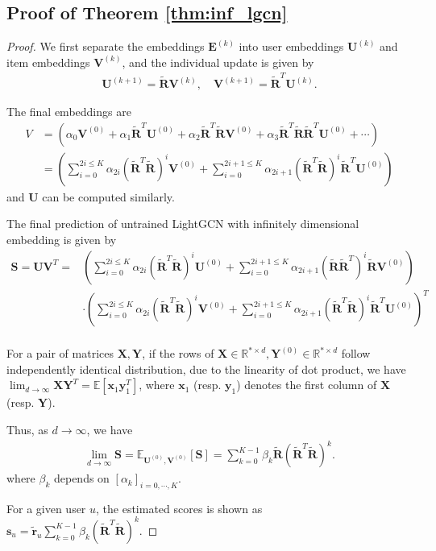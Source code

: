 \documentclass[sigconf]{acmart}
\begin{document}
\subsection{Proof of Theorem \ref{thm:inf_lgcn}}
\begin{proof}
We first separate the embeddings $\bm{E}^{(k)}$ into user embeddings $\bm{U}^{(k)}$ and item embeddings $\bm{V}^{(k)}$, and the individual update is given by
\begin{align*}
    \bm{U}^{(k+1)} = \tilde{\bm{R}} \bm{V}^{(k)}, \quad \bm{V}^{(k+1)} = \tilde{\bm{R}}^T \bm{U}^{(k)}.
\end{align*}

The final embeddings are 
\begin{align*}
    V &=  \left(\alpha_0\bm{V}^{(0)} + \alpha_1 \tilde{\bm{R}}^T\bm{U}^{(0)} + \alpha_2\tilde{\bm{R}}^T\tilde{\bm{R}}\bm{V}^{(0)} + \alpha_3 \tilde{\bm{R}}^T\tilde{\bm{R}}\tilde{\bm{R}}^T\bm{U}^{(0)} + \cdots\right) \\
    &= 
    \left(\sum_{i=0}^{2i \leq K} \alpha_{2i}(\tilde{\bm{R}}^T\tilde{\bm{R}})^{i} \bm{V}^{(0)} + \sum_{i = 0}^{2i+1 \leq K} \alpha_{2i+1}(\tilde{\bm{R}}^T \tilde{\bm{R}})^{i} \tilde{\bm{R}}^T \bm{U}^{(0)} \right)
\end{align*}
and $\bm{U}$ can be computed similarly.

The final prediction of untrained LightGCN with infinitely dimensional embedding is given by
\begin{align*} \label{eq:rec}
    \bm{S} = \bm{U} \bm{V}^T = &\left(\sum_{i=0}^{2i \leq K}\alpha_{2i} (\tilde{\bm{R}}^T\tilde{\bm{R}})^{i} \bm{U}^{(0)} + \sum_{i = 0}^{2i+1 \leq K} \alpha_{2i+1}(\tilde{\bm{R}} \tilde{\bm{R}}^T)^{i} \tilde{\bm{R}} \bm{V}^{(0)} \right)  \\
    &\cdot \left(\sum_{i=0}^{2i \leq K} \alpha_{2i}(\tilde{\bm{R}}^T\tilde{\bm{R}})^{i} \bm{V}^{(0)} + \sum_{i = 0}^{2i+1 \leq K} \alpha_{2i+1}(\tilde{\bm{R}}^T \tilde{\bm{R}})^{i} \tilde{\bm{R}}^T \bm{U}^{(0)} \right)^T \\
\end{align*}



For a pair of matrices $\bm{X}, \bm{Y}$, if the rows of $\bm{X} \in \mathbb{R}^{* \times d}, \bm{Y}^{(0)} \in \mathbb{R}^{* \times d} $ follow independently identical distribution, due to the linearity of dot product, we have $\lim_{d \rightarrow \infty} \bm{X} \bm{Y}^T = \mathbb{E} [\bm{x}_1 \bm{y}_1^T]$, where $\bm{x}_1$ (resp. $\bm{y}_1$) denotes the first column of $\bm{X}$ (resp. $\bm{Y}$).

Thus, as $d \rightarrow \infty$, we have 
\begin{align*}
    \lim_{d \rightarrow \infty} \bm{S} = \mathbb{E}_{\bm{U}^{(0)}, \bm{V}^{(0)}} [\bm{S}] = \sum_{k=0}^{K-1} \beta_k \tilde{\bm{R}} (\tilde{\bm{R}}^T\tilde{\bm{R}})^k.
\end{align*}
where $\beta_k$ depends on $[\alpha_k]_{i = 0,\cdots,K}$.

For a given user $u$, the estimated scores is shown as \\ $\bm{s}_u = \tilde{\bm{r}}_u \sum_{k=0}^{K-1} \beta_k  (\tilde{\bm{R}}^T\tilde{\bm{R}})^k$.

\end{proof}
\end{document}
